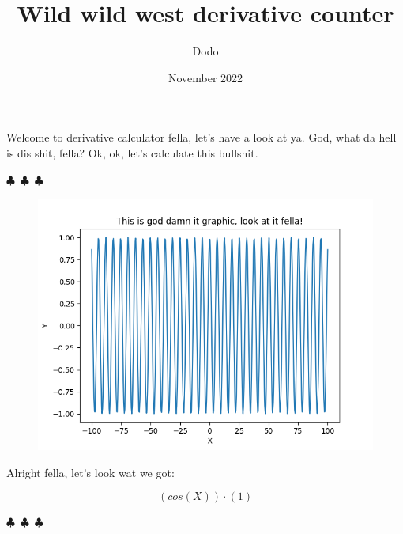 \documentclass{article}
\title{Wild wild west derivative counter}
\author{Dodo}
\date{November 2022}
\begin{document}
    \maketitle
    
        Welcome to derivative calculator fella, let's have a look at ya. God, what da hell is dis shit, fella?
        Ok, ok, let's calculate this bullshit.

        \begin{center}
        $\clubsuit$~$\clubsuit$~$\clubsuit$
        \end{center}
    \begin{figure}[H] \includegraphics[scale=0.6]{function_graph.png} \end{figure}Alright fella, let's look wat we got:

\begin{equation}
{({cos({X})})\cdot({1})}
\end{equation}
\begin{center} $\clubsuit$~$\clubsuit$~$\clubsuit$ \end{center}
\end{document}
